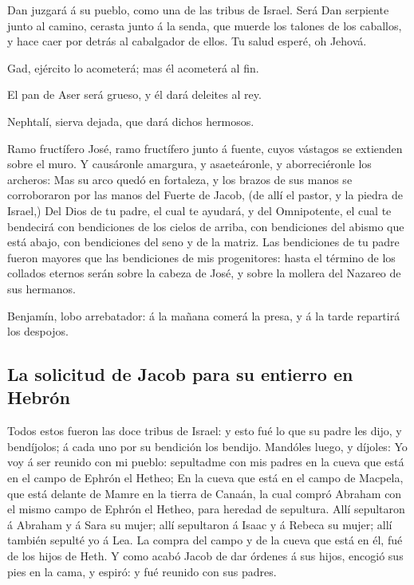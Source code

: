  Dan juzgará á su pueblo, como una de las tribus de
Israel.  Será Dan serpiente junto al camino, cerasta
junto á la senda, que muerde los talones de los caballos, y hace caer
por detrás al cabalgador de ellos.  Tu salud esperé, oh
Jehová.

 Gad, ejército lo acometerá; mas él acometerá al fin.

 El pan de Aser será grueso, y él dará deleites al rey.

 Nephtalí, sierva dejada, que dará dichos hermosos.

 Ramo fructífero José, ramo fructífero junto á fuente,
cuyos vástagos se extienden sobre el muro.  Y causáronle
amargura, y asaeteáronle, y aborreciéronle los archeros: 
Mas su arco quedó en fortaleza, y los brazos de sus manos se
corroboraron por las manos del Fuerte de Jacob, (de allí el pastor, y la
piedra de Israel,)  Del Dios de tu padre, el cual te
ayudará, y del Omnipotente, el cual te bendecirá con bendiciones de los
cielos de arriba, con bendiciones del abismo que está abajo, con
bendiciones del seno y de la matriz.  Las bendiciones de
tu padre fueron mayores que las bendiciones de mis progenitores: hasta
el término de los collados eternos serán sobre la cabeza de José, y
sobre la mollera del Nazareo de sus hermanos.

 Benjamín, lobo arrebatador: á la mañana comerá la presa,
y á la tarde repartirá los despojos.

\hypertarget{la-solicitud-de-jacob-para-su-entierro-en-hebruxf3n}{%
\subsection{La solicitud de Jacob para su entierro en
Hebrón}\label{la-solicitud-de-jacob-para-su-entierro-en-hebruxf3n}}

 Todos estos fueron las doce tribus de Israel: y esto fué
lo que su padre les dijo, y bendíjolos; á cada uno por su bendición los
bendijo.  Mandóles luego, y díjoles: Yo voy á ser reunido
con mi pueblo: sepultadme con mis padres en la cueva que está en el
campo de Ephrón el Hetheo;  En la cueva que está en el
campo de Macpela, que está delante de Mamre en la tierra de Canaán, la
cual compró Abraham con el mismo campo de Ephrón el Hetheo, para heredad
de sepultura.  Allí sepultaron á Abraham y á Sara su
mujer; allí sepultaron á Isaac y á Rebeca su mujer; allí también sepulté
yo á Lea.  La compra del campo y de la cueva que está en
él, fué de los hijos de Heth.  Y como acabó Jacob de dar
órdenes á sus hijos, encogió sus pies en la cama, y espiró: y fué
reunido con sus padres.

